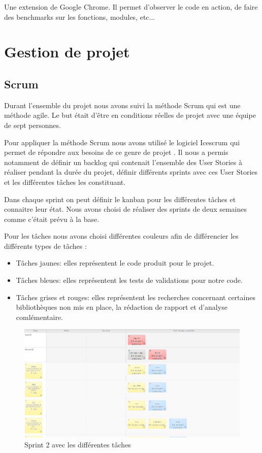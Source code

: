 \documentclass [a4paper,11pt]{article}
\begin{document}
Une extension de Google Chrome. Il permet d'observer le code en action, de faire des benchmarks sur les fonctions, modules, etc...

\newpage
\section{Gestion de projet}

\subsection{Scrum}

Durant l'ensemble du projet nous avons suivi la méthode Scrum qui est une méthode agile. Le but était d'être en conditions réelles de projet avec une équipe de sept personnes. 
\newline

Pour appliquer la méthode Scrum nous avons utilisé le logiciel Icescrum qui permet de répondre aux besoins de ce genre de projet \cite{ICESCRUM}. Il nous a permis notamment de définir un backlog qui contenait l'ensemble des User Stories à réaliser pendant la durée du projet, définir différents sprints avec ces User Stories et les différentes tâches les constituant. 
\newline

Dans chaque sprint on peut définir le kanban pour les différentes tâches et connaitre leur état. Nous avons choisi de réaliser des sprints de deux semaines comme c'était prévu à la base.
\newline

Pour les tâches nous avons choisi différentes couleurs afin de différencier les différents types de tâches :
\newline

\begin{itemize}
\item Tâches jaunes: elles représentent le code produit pour le projet.
\item Tâches bleues: elles représentent les tests de validations pour notre code.
\item Tâches grises et rouges: elles représentent les recherches concernant certaines bibliothèques non mis en place, la rédaction de rapport et d'analyse comlémentaire.
\end{itemize}

\begin{figure}[!h]
\centering
\includegraphics[scale=0.3]{img/icescrum.png}
\caption[Scrum]{Sprint 2 avec les différentes tâches}
\end{figure}
\end{document}

